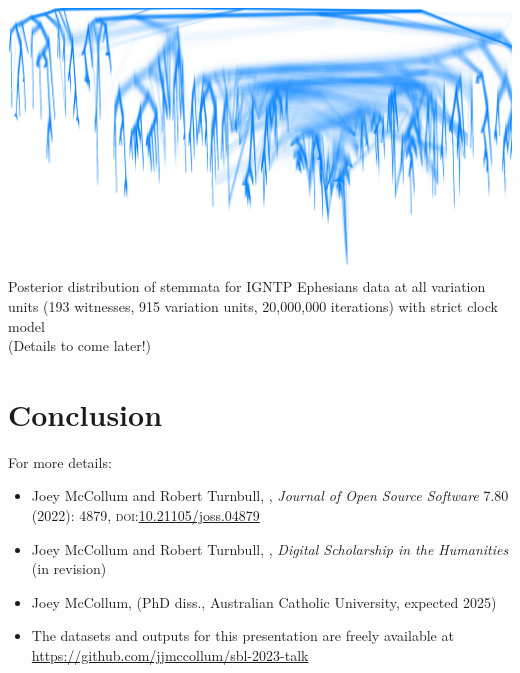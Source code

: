 \documentclass[10pt]{beamer}
\begin{document}
	\begin{frame}
		\begin{center}
			\includegraphics[width=\textwidth]{../img/igntp_ephesians_strict_densitree_unlabeled.pdf}\\
			Posterior distribution of stemmata for IGNTP Ephesians data at all variation units (193 witnesses, 915 variation units, 20,000,000 iterations) with strict clock model\\
			(Details to come later!)
		\end{center}
	\end{frame}
	\section{Conclusion}
	\begin{frame}
		For more details:
		\begin{itemize}
			\item Joey McCollum and Robert Turnbull, , \emph{Journal of Open Source Software} 7.80 (2022): 4879, \textsc{doi}:\href{https://doi.org/10.21105/joss.04879}{10.21105/joss.04879}
			\item Joey McCollum and Robert Turnbull, , \emph{Digital Scholarship in the Humanities} (in revision)
			\item Joey McCollum,  (PhD diss., Australian Catholic University, expected 2025)
			\item The datasets and outputs for this presentation are freely available at \url{https://github.com/jjmccollum/sbl-2023-talk}
		\end{itemize}
	\end{frame}
\end{document}
